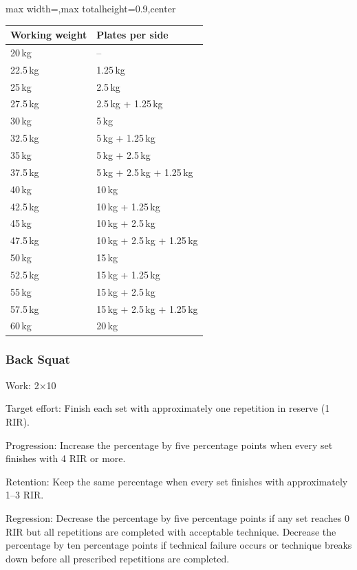 \documentclass[11pt,a4paper]{article}
\newcommand{\tablearraystretch}{1.15}
\begin{document}
\begin{center}
\renewcommand{\arraystretch}{\tablearraystretch}
\begin{adjustbox}{max width=\linewidth,max totalheight=0.9\textheight,center}
\begin{tabular}{ll}
\toprule
Working weight & Plates per side \\
\midrule
20\,kg & -- \\
22.5\,kg & 1.25\,kg \\
25\,kg & 2.5\,kg \\
27.5\,kg & 2.5\,kg + 1.25\,kg \\
30\,kg & 5\,kg \\
32.5\,kg & 5\,kg + 1.25\,kg \\
35\,kg & 5\,kg + 2.5\,kg \\
37.5\,kg & 5\,kg + 2.5\,kg + 1.25\,kg \\
40\,kg & 10\,kg \\
42.5\,kg & 10\,kg + 1.25\,kg \\
45\,kg & 10\,kg + 2.5\,kg \\
47.5\,kg & 10\,kg + 2.5\,kg + 1.25\,kg \\
50\,kg & 15\,kg \\
52.5\,kg & 15\,kg + 1.25\,kg \\
55\,kg & 15\,kg + 2.5\,kg \\
57.5\,kg & 15\,kg + 2.5\,kg + 1.25\,kg \\
60\,kg & 20\,kg \\
\bottomrule
\end{tabular}
\end{adjustbox}
\renewcommand{\arraystretch}{1}
\end{center}

\newpage
\subsubsection{Back Squat}

Work: 2$\times$10

Target effort: Finish each set with approximately one repetition in reserve (1 RIR).

Progression: Increase the percentage by five percentage points when every set finishes with 4 RIR or more.

Retention: Keep the same percentage when every set finishes with approximately 1--3 RIR.

Regression: Decrease the percentage by five percentage points if any set reaches 0 RIR but all repetitions are completed with acceptable technique. Decrease the percentage by ten percentage points if technical failure occurs or technique breaks down before all prescribed repetitions are completed.
\end{document}
